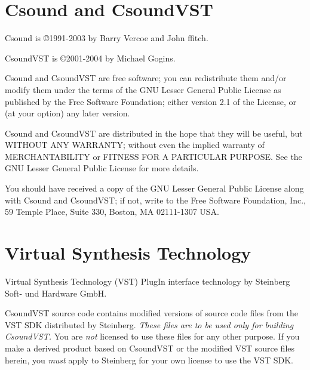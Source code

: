 \documentclass[10pt,letterpaper,onecolumn]{book}
\begin{document}
\section{Csound and CsoundVST}

Csound is \copyright 1991-2003 by Barry Vercoe and John ffitch.

CsoundVST is \copyright 2001-2004 by Michael Gogins.

Csound and CsoundVST are free software; you can redistribute them and/or modify them under the terms of the GNU Lesser General Public License as published by the Free Software Foundation; either version 2.1 of the License, or (at your option) any later version.

Csound and CsoundVST are distributed in the hope that they will be useful, but WITHOUT ANY WARRANTY; without even the implied warranty of MERCHANTABILITY or FITNESS FOR A PARTICULAR PURPOSE.  See the GNU Lesser General Public License for more details.

You should have received a copy of the GNU Lesser General Public License along with Csound and CsoundVST; if not, write to the Free Software Foundation, Inc., 59 Temple Place, Suite 330, Boston, MA 02111-1307 USA.

\section{Virtual Synthesis Technology}
Virtual Synthesis Technology (VST) PlugIn interface technology by Steinberg Soft- und Hardware GmbH. 

CsoundVST source code contains modified versions of source code files from the VST SDK distributed by Steinberg. \emph{These files are to be used only for building CsoundVST.} You are \emph{not} licensed to use these files for any other purpose. If you make a derived product based on CsoundVST or the modified VST source files herein, you \emph{must} apply to Steinberg for your own license to use the VST SDK.
\end{document}
